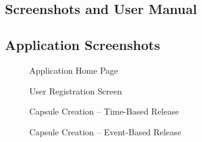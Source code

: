 \documentclass[12pt, a4paper]{article}
\begin{document}
\newpage
\begin{appendices}

\section{Screenshots and User Manual}
\label{appendix:screenshots}

\subsection{Application Screenshots}

\begin{figure}[H]
  \centering
  \caption{Application Home Page}
  \label{fig:app_home}
\end{figure}

\begin{figure}[H]
  \centering
  \caption{User Registration Screen}
  \label{fig:app_register}
\end{figure}

\begin{figure}[H]
  \centering
  \caption{Capsule Creation -- Time-Based Release}
  \label{fig:app_create_time}
\end{figure}

\begin{figure}[H]
  \centering
  \caption{Capsule Creation -- Event-Based Release}
  \label{fig:app_create_event}
\end{figure}


\end{appendices}
\end{document}
